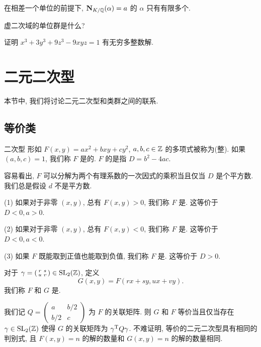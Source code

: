 \begin{exercise}
在相差一个单位的前提下, ${\mathbf{N}}_{K/{\mathbb{Q}}}(\alpha)=a$ 的 $\alpha$ 只有有限多个.
\end{exercise}

\begin{exercise}
虚二次域的单位群是什么?
\end{exercise}

\begin{exercise}
证明 $x^3+3y^3+9z^3-9xyz=1$ 有无穷多整数解.
\end{exercise}


\section{二元二次型}
本节中, 我们将讨论二元二次型和类群之间的联系.

\subsection{等价类}

\begin{definition}{二次型}{}
形如 $F(x,y)=ax^2+bxy+cy^2$, $a,b,c\in{\mathbb{Z}}$ 的多项式被称为(整). 如果 $(a,b,c)=1$, 我们称 $F$ 是的. $F$ 的是指 $D=b^2-4ac$.
\end{definition}


容易看出, $F$ 可以分解为两个有理系数的一次因式的乘积当且仅当 $D$ 是个平方数. 我们总是假设 $d$ 不是平方数.

\begin{definition}{}{}
(1) 如果对于非零 $(x,y)$, 总有 $F(x,y)>0$, 我们称 $F$ 是. 这等价于 $D<0,a>0$.

(2) 如果对于非零 $(x,y)$, 总有 $F(x,y)<0$, 我们称 $F$ 是. 这等价于 $D<0,a<0$.

(3) 如果 $F$ 既能取到正值也能取到负值, 我们称 $F$ 是. 这等价于 $D>0$.
\end{definition}

对于 $\gamma=\left(\begin{smallmatrix}
r&s\\u&v
\end{smallmatrix}\right)
\in{\mathrm{SL}}_2({\mathbb{Z}})$, 定义
	\[G(x,y)=F(rx+sy,ux+vy).\]
我们称 $F$ 和 $G$ 是.

我们记 $Q=\left(\begin{smallmatrix}
a&b/2\\b/2&c
\end{smallmatrix}\right)$ 为 $F$ 的关联矩阵.
则 $G$ 和 $F$ 等价当且仅当存在 $\gamma\in{\mathrm{SL}}_2({\mathbb{Z}})$ 使得 $G$ 的关联矩阵为 $\gamma^{\mathrm{T}} Q\gamma$.
不难证明, 等价的二元二次型具有相同的判别式, 且 $F(x,y)=n$ 的解的数量和 $G(x,y)=n$ 的解的数量相同.

